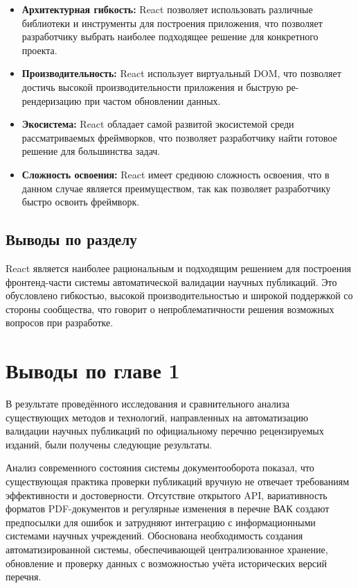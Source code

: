 \begin{itemize}
	\item \textbf{Архитектурная гибкость:} React позволяет использовать различные библиотеки и инструменты для построения приложения, что позволяет разработчику выбрать наиболее подходящее решение для конкретного проекта.
	\item \textbf{Производительность:} React использует виртуальный DOM, что позволяет достичь высокой производительности приложения и быструю ре-рендеризацию при частом обновлении данных.
	\item \textbf{Экосистема:} React обладает самой развитой экосистемой среди рассматриваемых фреймворков, что позволяет разработчику найти готовое решение для большинства задач.
	\item \textbf{Сложность освоения:} React имеет среднюю сложность освоения, что в данном случае является преимуществом, так как позволяет разработчику быстро освоить фреймворк.
\end{itemize}


\subsection{Выводы по разделу}

React является наиболее рациональным и подходящим решением для построения фронтенд-части системы автоматической валидации научных публикаций.
Это обусловлено гибкостью, высокой производительностью и широкой поддержкой со стороны сообщества, что говорит
о непроблематичности решения возможных вопросов при разработке.


\section{Выводы по главе 1}
В результате проведённого исследования и сравнительного анализа существующих методов
и технологий, направленных на автоматизацию валидации научных публикаций по
официальному перечню рецензируемых изданий, были получены следующие результаты.

Анализ современного состояния системы документооборота показал, что существующая
практика проверки публикаций вручную не отвечает требованиям эффективности и достоверности.
Отсутствие открытого API, вариативность форматов PDF-документов и регулярные
изменения в перечне ВАК создают предпосылки для ошибок и затрудняют интеграцию с
информационными системами научных учреждений. Обоснована необходимость создания
автоматизированной системы, обеспечивающей централизованное хранение, обновление и
проверку данных с возможностью учёта исторических версий перечня.

